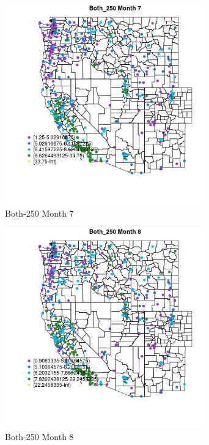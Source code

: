 \begin{figure} 
\centering  
\includegraphics[width=0.77\textwidth]{Code_Outputs/ML_input_report_ML_input_PM25_Step5_part_d_de_duplicated_aves_ML_input_MapObsMo7Both_250.jpg} 
\caption{\label{fig:ML_input_report_ML_input_PM25_Step5_part_d_de_duplicated_aves_ML_inputMapObsMo7Both_250}Both-250 Month 7} 
\end{figure} 
 

\clearpage 

\begin{figure} 
\centering  
\includegraphics[width=0.77\textwidth]{Code_Outputs/ML_input_report_ML_input_PM25_Step5_part_d_de_duplicated_aves_ML_input_MapObsMo8Both_250.jpg} 
\caption{\label{fig:ML_input_report_ML_input_PM25_Step5_part_d_de_duplicated_aves_ML_inputMapObsMo8Both_250}Both-250 Month 8} 
\end{figure} 
 

